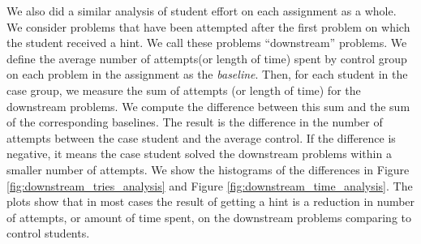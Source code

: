 \documentclass{llncs2e/llncs}
\begin{document}
We also did a similar analysis of student effort on each assignment as a whole. We consider problems that have been attempted after the first problem on which the student received a hint. We call these problems ``downstream'' problems. We define the average number of attempts(or length of time) spent by control group on each problem in the assignment as the {\em baseline}. Then, for each student in the case group, we measure the sum of attempts (or length of time) for the downstream problems. We compute the difference between this sum and the sum of the corresponding baselines. The result is the difference in the number of attempts between the case student and the average control. If the difference is negative, it means the case student solved the downstream problems within a smaller number of attempts. We show the histograms of the differences in Figure \ref{fig:downstream_tries_analysis} and Figure \ref{fig:downstream_time_analysis}. The plots show that in most cases the result of getting a hint is a reduction in number of attempts, or amount of time spent, on the downstream problems comparing to control
students.
\end{document}
